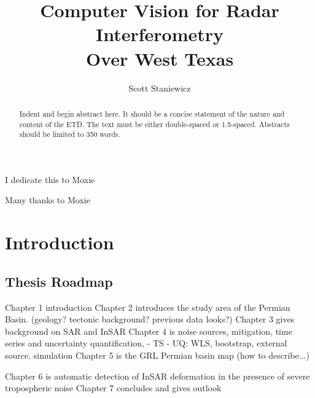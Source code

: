 \documentclass{utexasthesis}
\title{Computer Vision for Radar Interferometry \\ Over West Texas }
\author{Scott Staniewicz}
\begin{document}
\maketitle

\begin{dedication}
  I dedicate this to Moxie
\end{dedication}


\begin{acknowledgments}
  Many thanks to Moxie
\end{acknowledgments}

\begin{abstract}
  Indent and begin abstract here. It should be a concise statement of the nature and content of the ETD. The text must be either double-spaced or 1.5-spaced. Abstracts should be limited to 350 words.
\end{abstract}

\maketableofcontents


\chapter{Introduction}


\section{Thesis Roadmap}

Chapter 1 introduction
Chapter 2 introduces the study area of the Permian Basin. (geology? tectonic background? previous data looks?)
Chapter 3 gives background on SAR and InSAR
Chapter 4 is noise sources, mitigation, time series and uncertainty quantification,
  - TS
  - UQ: WLS, bootstrap, external source. simulation
Chapter 5 is the GRL Permian basin map (how to describe...)

Chapter 6 is automatic detection of InSAR deformation in the presence of severe tropospheric noise
Chapter 7 concludes and gives outlook
\end{document}
